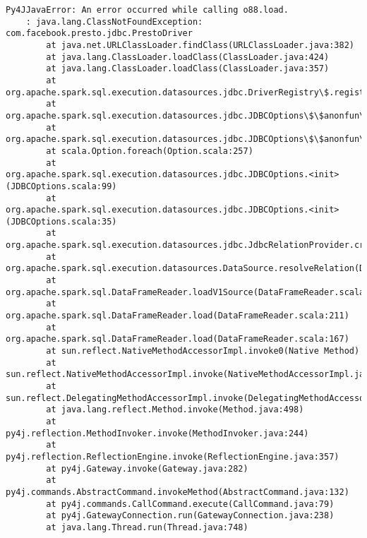 \documentclass[11pt]{article}
\begin{document}
\begin{Verbatim}[commandchars=\\\{\}]
        Py4JJavaError: An error occurred while calling o88.load.
    : java.lang.ClassNotFoundException: com.facebook.presto.jdbc.PrestoDriver
    	at java.net.URLClassLoader.findClass(URLClassLoader.java:382)
    	at java.lang.ClassLoader.loadClass(ClassLoader.java:424)
    	at java.lang.ClassLoader.loadClass(ClassLoader.java:357)
    	at org.apache.spark.sql.execution.datasources.jdbc.DriverRegistry\$.register(DriverRegistry.scala:45)
    	at org.apache.spark.sql.execution.datasources.jdbc.JDBCOptions\$\$anonfun\$5.apply(JDBCOptions.scala:99)
    	at org.apache.spark.sql.execution.datasources.jdbc.JDBCOptions\$\$anonfun\$5.apply(JDBCOptions.scala:99)
    	at scala.Option.foreach(Option.scala:257)
    	at org.apache.spark.sql.execution.datasources.jdbc.JDBCOptions.<init>(JDBCOptions.scala:99)
    	at org.apache.spark.sql.execution.datasources.jdbc.JDBCOptions.<init>(JDBCOptions.scala:35)
    	at org.apache.spark.sql.execution.datasources.jdbc.JdbcRelationProvider.createRelation(JdbcRelationProvider.scala:32)
    	at org.apache.spark.sql.execution.datasources.DataSource.resolveRelation(DataSource.scala:318)
    	at org.apache.spark.sql.DataFrameReader.loadV1Source(DataFrameReader.scala:223)
    	at org.apache.spark.sql.DataFrameReader.load(DataFrameReader.scala:211)
    	at org.apache.spark.sql.DataFrameReader.load(DataFrameReader.scala:167)
    	at sun.reflect.NativeMethodAccessorImpl.invoke0(Native Method)
    	at sun.reflect.NativeMethodAccessorImpl.invoke(NativeMethodAccessorImpl.java:62)
    	at sun.reflect.DelegatingMethodAccessorImpl.invoke(DelegatingMethodAccessorImpl.java:43)
    	at java.lang.reflect.Method.invoke(Method.java:498)
    	at py4j.reflection.MethodInvoker.invoke(MethodInvoker.java:244)
    	at py4j.reflection.ReflectionEngine.invoke(ReflectionEngine.java:357)
    	at py4j.Gateway.invoke(Gateway.java:282)
    	at py4j.commands.AbstractCommand.invokeMethod(AbstractCommand.java:132)
    	at py4j.commands.CallCommand.execute(CallCommand.java:79)
    	at py4j.GatewayConnection.run(GatewayConnection.java:238)
    	at java.lang.Thread.run(Thread.java:748)


    \end{Verbatim}


    
    
    
    
\end{document}
